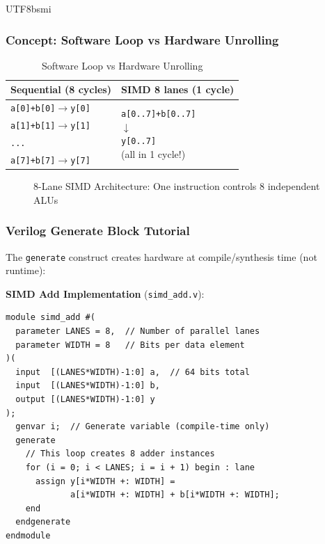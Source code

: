 \documentclass[journal,twoside]{IEEEtran}
\begin{document}
\begin{CJK}{UTF8}{bsmi}
\subsubsection{Concept: Software Loop vs Hardware Unrolling}
\begin{table}[!t]
\centering
\caption{Software Loop vs Hardware Unrolling}
\footnotesize
\begin{tabular}{@{}p{}|p{}@{}}
\toprule
\textbf{Sequential (8 cycles)} & \textbf{SIMD 8 lanes (1 cycle)} \\
\midrule
\texttt{a[0]+b[0]$\to$y[0]} & \multirow{5}{*}{\parbox{0.4\columnwidth}{\centering\texttt{a[0..7]+b[0..7]}\\$\downarrow$\\\texttt{y[0..7]}\\(all in 1 cycle!)}} \\
\texttt{a[1]+b[1]$\to$y[1]} & \\
\texttt{...} & \\
\texttt{a[7]+b[7]$\to$y[7]} & \\
\bottomrule
\end{tabular}
\end{table}

\begin{figure}[!t]
\centering
{}
\caption{8-Lane SIMD Architecture: One instruction controls 8 independent ALUs}
\label{fig:simd}
\end{figure}

\subsubsection{Verilog Generate Block Tutorial}
The \texttt{generate} construct creates hardware at compile/synthesis time (not runtime):

\textbf{SIMD Add Implementation} (\texttt{simd\_add.v}):
\begin{lstlisting}
module simd_add #(
  parameter LANES = 8,  // Number of parallel lanes
  parameter WIDTH = 8   // Bits per data element
)(
  input  [(LANES*WIDTH)-1:0] a,  // 64 bits total
  input  [(LANES*WIDTH)-1:0] b,
  output [(LANES*WIDTH)-1:0] y
);
  genvar i;  // Generate variable (compile-time only)
  generate
    // This loop creates 8 adder instances
    for (i = 0; i < LANES; i = i + 1) begin : lane
      assign y[i*WIDTH +: WIDTH] = 
             a[i*WIDTH +: WIDTH] + b[i*WIDTH +: WIDTH];
    end
  endgenerate
endmodule
\end{lstlisting}


\end{CJK}
\end{document}
